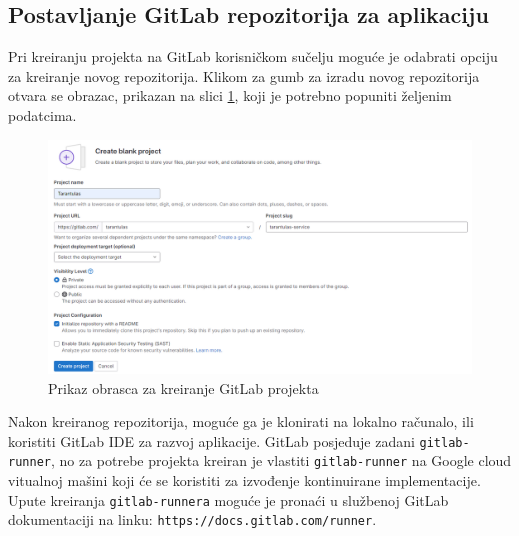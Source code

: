 \documentclass[a4paper,12pt,oneside]{article}
\begin{document}
\subsection{Postavljanje GitLab repozitorija za aplikaciju}

Pri kreiranju projekta na GitLab korisničkom sučelju moguće je odabrati opciju za kreiranje novog repozitorija. Klikom za gumb za izradu novog repozitorija otvara se obrazac, prikazan na slici \ref{fig:git-create-blank}, koji je potrebno popuniti željenim podatcima.

\begin{figure}
    \centering
    \includegraphics[width=1\linewidth]{Slike/git-create-blank-project.png}
    \caption{Prikaz obrasca za kreiranje GitLab projekta \cite{springArchitectureLayers}}
    \label{fig:git-create-blank}
\end{figure}

Nakon kreiranog repozitorija, moguće ga je klonirati na lokalno računalo, ili koristiti GitLab IDE za razvoj aplikacije. GitLab posjeduje zadani \texttt{gitlab-runner}, no za potrebe projekta kreiran je vlastiti \texttt{gitlab-runner} na Google cloud vitualnoj mašini koji će se koristiti za izvođenje kontinuirane implementacije. Upute kreiranja \texttt{gitlab-runnera} moguće je pronaći u službenoj GitLab dokumentaciji na linku: \texttt{https://docs.gitlab.com/runner}.  
\end{document}
